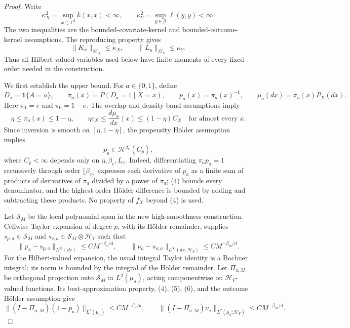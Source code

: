 \documentclass{article}
\begin{document}
\begin{proof}
Write
\[
 \kappa_X^2=\sup_{x\in\mathbb T^d}k(x,x)<\infty,
 \qquad
 \kappa_Y^2=\sup_{y\in\mathcal Y}\ell(y,y)<\infty.
 \tag{1}
\]
The two inequalities are the bounded-covariate-kernel and bounded-outcome-kernel assumptions.  The reproducing property gives
\[
 \|K_x\|_{\mathcal H_X}\leq\kappa_X,
 \qquad
 \|L_y\|_{\mathcal H_Y}\leq\kappa_Y.
 \tag{2}
\]
Thus all Hilbert-valued variables used below have finite moments of every fixed order needed in the construction.

We first establish the upper bound.  For \(a\in\{0,1\}\), define
\[
 D_a=\mathbf 1\{A=a\},
 \qquad
 \pi_a(x)=P(D_a=1\mid X=x),
 \qquad
 p_a(x)=\pi_a(x)^{-1},
 \qquad
 \mu_a(dx)=\pi_a(x)P_X(dx).
 \tag{3}
\]
Here \(\pi_1=e\) and \(\pi_0=1-e\).  The overlap and density-band assumptions imply
\[
 \eta\leq\pi_a(x)\leq1-\eta,
 \qquad
 \eta c_X\leq\frac{d\mu_a}{dx}(x)\leq(1-\eta)C_X
 \quad\text{for almost every }x.
 \tag{4}
\]
Since inversion is smooth on \([\eta,1-\eta]\), the propensity Hölder assumption implies
\[
 p_a\in\mathcal H^{\beta_e}(C_p),
 \tag{5}
\]
where \(C_p<\infty\) depends only on \(\eta,\beta_e,L_e\).  Indeed, differentiating \(\pi_ap_a=1\) recursively through order \(\lfloor\beta_e\rfloor\) expresses each derivative of \(p_a\) as a finite sum of products of derivatives of \(\pi_a\) divided by a power of \(\pi_a\); (4) bounds every denominator, and the highest-order Hölder difference is bounded by adding and subtracting these products.  No property of \(f_X\) beyond (4) is used.

Let \(\mathcal S_M\) be the local polynomial span in the new high-smoothness construction.  Cellwise Taylor expansion of degree \(p\), with its Hölder remainder, supplies \(s_{p,a}\in\mathcal S_M\) and \(s_{\nu,a}\in\mathcal S_M\otimes\mathcal H_Y\) such that
\[
 \|p_a-s_{p,a}\|_{L^\infty(dx)}
 \leq C M^{-\beta_e/d},
 \qquad
 \|\nu_a-s_{\nu,a}\|_{L^\infty(dx;\mathcal H_Y)}
 \leq C M^{-\beta_m/d}.
 \tag{6}
\]
For the Hilbert-valued expansion, the usual integral Taylor identity is a Bochner integral; its norm is bounded by the integral of the Hölder remainder.  Let \(\Pi_{a,M}\) be orthogonal projection onto \(\mathcal S_M\) in \(L^2(\mu_a)\), acting componentwise on \(\mathcal H_Y\)-valued functions.  Its best-approximation property, (4), (5), (6), and the outcome Hölder assumption give
\[
 \|(I-\Pi_{a,M})(1-p_a)\|_{L^2(\mu_a)}
 \leq C M^{-\beta_e/d},
 \qquad
 \|(I-\Pi_{a,M})\nu_a\|_{L^2(\mu_a;\mathcal H_Y)}
 \leq C M^{-\beta_m/d}.
 \tag{7}
\]


\end{proof}
\end{document}
